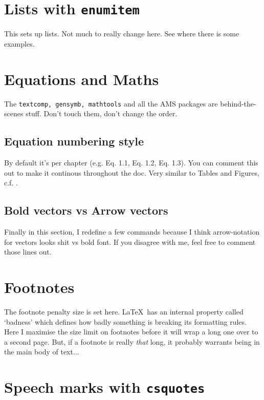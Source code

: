 \documentclass[../main]{subfiles}
\begin{document}
\section{Lists with \texttt{enumitem}}

This sets up lists. Not much to really change here. See  where there is some examples.

\section{Equations and Maths}

The \texttt{textcomp, gensymb, mathtools} and all the AMS packages are behind-the-scenes stuff. Don't touch them, don't change the order.

\subsection{Equation numbering style}\label{sub:equation_numbering}

By default it's per chapter (e.g. Eq. 1.1, Eq. 1.2, Eq. 1.3). You can comment this out to make it continous throughout the doc. Very similar to Tables and Figures, c.f. .

\subsection{Bold vectors vs Arrow vectors}

Finally in this section, I redefine a few commands because I think arrow-notation for vectors looks shit vs bold font. If you disagree with me, feel free to comment those lines out.


\section{Footnotes}

The footnote penalty size is set here. \LaTeX\ has an internal property called `badness' which defines how badly something is breaking its formatting rules. Here I maximise the size limit on footnotes before it will wrap a long one over to a second page. But, if a footnote is really \textit{that} long, it probably warrants being in the main body of text...

\section{Speech marks with \texttt{csquotes}}
\end{document}
